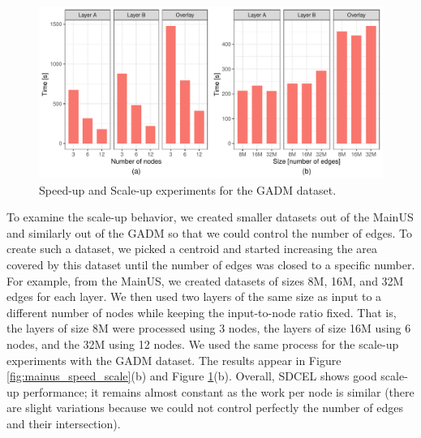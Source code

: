 \begin{figure}
    \centering
    \includegraphics[width=\textwidth]{chapterSDCEL/GADM_SS/GADM_SS}
    \caption{Speed-up and Scale-up experiments for the GADM dataset.} \label{fig:gadm_speed_scale}
\end{figure}

To examine the scale-up behavior, we created smaller datasets out of the MainUS and similarly out of the GADM so that we could control the number of edges. To create such a dataset, we picked a centroid and started increasing the area covered by this dataset until the number of edges was closed to a specific number. For example, from the MainUS, we created datasets of sizes 8M, 16M, and 32M edges for each layer. We then used two layers of the same size as input to a different number of nodes while keeping the input-to-node ratio fixed. That is, the layers of size 8M were processed using 3 nodes, the layers of size 16M using 6 nodes, and the 32M using 12 nodes. We used the same process for the scale-up experiments with the GADM dataset. The results appear in Figure \ref{fig:mainus_speed_scale}(b) and Figure \ref{fig:gadm_speed_scale}(b).  Overall, SDCEL shows good scale-up performance; it remains almost constant as the work per node is similar (there are slight variations because we could not control perfectly the number of edges and their intersection).


